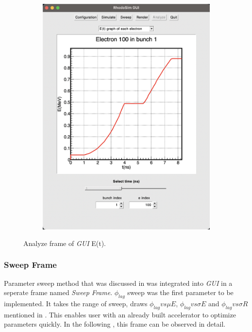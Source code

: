 \documentclass[a4paper,oneside,12pt]{report}
\numberwithin{equation}{chapter}
\begin{document}
\begin{figure}
\begin{subfigure}{0.8\textwidth}
        \includegraphics[width=\linewidth]{./figures/rhodoSim/GUI_analyze_Et_2.png}
    \end{subfigure} 
    \caption{Analyze frame of \textit{GUI} E(t).}
    \label{fig:gui_analyze_Et}
\end{figure}

\subsubsection{Sweep Frame}
Parameter sweep method that was discussed in  was integrated into \textit{GUI} in a seperate frame named \textit{Sweep Frame}.
$\phi_{lag}$ sweep was the first parameter to be implemented. 
It takes the range of sweep, draws $\phi_{lag} vs \mu E$, $\phi_{lag} vs \sigma E$ and $\phi_{lag} vs \sigma R$ mentioned in .
This enables user with an already built accelerator to optimize \egun parameters quickly. 
In the following , this frame can be observed in detail.
\end{document}
